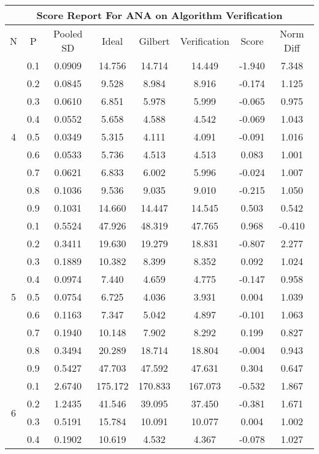 \documentclass[11pt,a4paper]{report}
\begin{document}
\begin{longtable}{ | c | c || c | c | c | c | c | c | }
\hline
\multicolumn{8}{|c|}{ Score Report For ANA on Algorithm Verification} \\
\hline
N & P & Pooled SD &  Ideal &  Gilbert & Verification  & Score & Norm Diff \\
 \hline
 \hline
 \endhead
\multirow{9}{*}{4} & 0.1 & 0.0909 & 14.756 & 14.714 & 14.449 & -1.940 & 7.348 \\
 & 0.2 & 0.0845 & 9.528 & 8.984 & 8.916 & -0.174 & 1.125 \\
 & 0.3 & 0.0610 & 6.851 & 5.978 & 5.999 & -0.065 & 0.975 \\
 & 0.4 & 0.0552 & 5.658 & 4.588 & 4.542 & -0.069 & 1.043 \\
 & 0.5 & 0.0349 & 5.315 & 4.111 & 4.091 & -0.091 & 1.016 \\
 & 0.6 & 0.0533 & 5.736 & 4.513 & 4.513 & 0.083 & 1.001 \\
 & 0.7 & 0.0621 & 6.833 & 6.002 & 5.996 & -0.024 & 1.007 \\
 & 0.8 & 0.1036 & 9.536 & 9.035 & 9.010 & -0.215 & 1.050 \\
 & 0.9 & 0.1031 & 14.660 & 14.447 & 14.545 & 0.503 & 0.542 \\
 \hline
\multirow{9}{*}{5} & 0.1 & 0.5524 & 47.926 & 48.319 & 47.765 & 0.968 & -0.410 \\
 & 0.2 & 0.3411 & 19.630 & 19.279 & 18.831 & -0.807 & 2.277 \\
 & 0.3 & 0.1889 & 10.382 & 8.399 & 8.352 & 0.092 & 1.024 \\
 & 0.4 & 0.0974 & 7.440 & 4.659 & 4.775 & -0.147 & 0.958 \\
 & 0.5 & 0.0754 & 6.725 & 4.036 & 3.931 & 0.004 & 1.039 \\
 & 0.6 & 0.1163 & 7.347 & 5.042 & 4.897 & -0.101 & 1.063 \\
 & 0.7 & 0.1940 & 10.148 & 7.902 & 8.292 & 0.199 & 0.827 \\
 & 0.8 & 0.3494 & 20.289 & 18.714 & 18.804 & -0.004 & 0.943 \\
 & 0.9 & 0.5427 & 47.703 & 47.592 & 47.631 & 0.304 & 0.647 \\
 \hline
\multirow{9}{*}{6} & 0.1 & 2.6740 & 175.172 & 170.833 & 167.073 & -0.532 & 1.867 \\
 & 0.2 & 1.2435 & 41.546 & 39.095 & 37.450 & -0.381 & 1.671 \\
 & 0.3 & 0.5191 & 15.784 & 10.091 & 10.077 & 0.004 & 1.002 \\
 & 0.4 & 0.1902 & 10.619 & 4.532 & 4.367 & -0.078 & 1.027 \\

\end{longtable}
\end{document}
